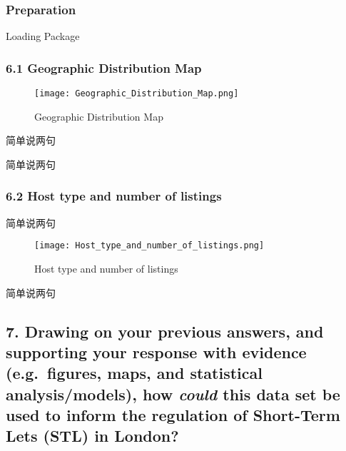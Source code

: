 \documentclass[
  a4paper,
  DIV=11,
  numbers=noendperiod]{scrartcl}
\begin{document}
\hypertarget{preparation}{%
\subsubsection{Preparation}\label{preparation}}

Loading Package

\hypertarget{geographic-distribution-map}{%
\subsubsection{6.1 Geographic Distribution
Map}\label{geographic-distribution-map}}

\begin{figure}

{\centering \texttt{[image: Geographic\_Distribution\_Map.png]}

}

\caption{Geographic Distribution Map}

\end{figure}

简单说两句

简单说两句

\hypertarget{host-type-and-number-of-listings}{%
\subsubsection{6.2 Host type and number of
listings}\label{host-type-and-number-of-listings}}

简单说两句

\begin{figure}

{\centering \texttt{[image: Host\_type\_and\_number\_of\_listings.png]}

}

\caption{Host type and number of listings}

\end{figure}

简单说两句

\hypertarget{drawing-on-your-previous-answers-and-supporting-your-response-with-evidence-e.g.-figures-maps-and-statistical-analysismodels-how-could-this-data-set-be-used-to-inform-the-regulation-of-short-term-lets-stl-in-london}{%
\subsection{\texorpdfstring{7. Drawing on your previous answers, and
supporting your response with evidence (e.g.~figures, maps, and
statistical analysis/models), how \emph{could} this data set be used to
inform the regulation of Short-Term Lets (STL) in
London?}{7. Drawing on your previous answers, and supporting your response with evidence (e.g.~figures, maps, and statistical analysis/models), how could this data set be used to inform the regulation of Short-Term Lets (STL) in London?}}\label{drawing-on-your-previous-answers-and-supporting-your-response-with-evidence-e.g.-figures-maps-and-statistical-analysismodels-how-could-this-data-set-be-used-to-inform-the-regulation-of-short-term-lets-stl-in-london}}
\end{document}
